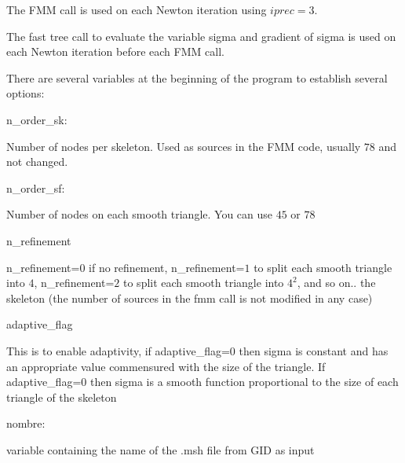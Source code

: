\documentclass[11pt, oneside]{article}   	%
\begin{document}
The FMM call is used on each Newton iteration using $iprec=3$.

The fast tree call to evaluate the variable sigma and gradient of sigma is used on each Newton iteration before each FMM call.

There are several variables at the beginning of the program to establish several options:
\newline
\newline

n\_order\_sk:
\newline
\newline

Number of nodes per skeleton. Used as sources in the FMM code, usually $78$ and not changed.
\newline
\newline

n\_order\_sf:
\newline
\newline

Number of nodes on each smooth triangle. You can use $45$ or $78$
\newline
\newline

n\_refinement
\newline
\newline

n\_refinement=$0$ if no refinement, n\_refinement=$1$ to split each smooth triangle into $4$, n\_refinement=$2$ to split each smooth triangle into $4^2$, and so on.. the skeleton (the number of sources in the fmm call is not modified in any case)
\newline
\newline

adaptive\_flag
\newline
\newline

This is to enable adaptivity, if adaptive\_flag=0 then sigma is constant and has an appropriate value commensured with the size of the triangle. If adaptive\_flag=0 then sigma is a smooth function proportional to the size of each triangle of the skeleton 
\newline
\newline

nombre:
\newline
\newline

variable containing the name of the .msh file from GID as input
\newline
\newline
\end{document}
